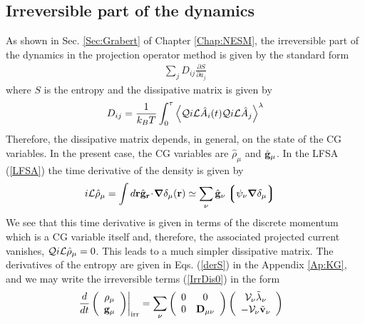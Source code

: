 \documentclass[b5paper,openright,11pt]{book}
\newcommand{\esc}{\!\cdot\!}
\newcommand{\llangle}{\left\langle}
\newcommand{\rrangle}{\right\rangle}
\newcommand{\llg}{\left\lgroup}
\newcommand{\rlg}{\right\rgroup}
\begin{document}
\subsection{Irreversible part of the dynamics}
As shown in  Sec. \ref{Sec:Grabert} of Chapter  \ref{Chap:NESM}, the  irreversible part of the
dynamics in  the projection operator  method is given by  the standard
form
\begin{align}
  \sum_jD_{ij}\frac{\partial S}{\partial a_j}
\label{IrrDis0}
\end{align}
where $S$ is the entropy and the dissipative matrix is given by
\begin{align}
  D_{ij}=\frac{1}{k_BT}\int_0^\tau\llangle {\cal Q}i{\cal L}\hat{A}_i(t){\cal Q}i{\cal L}\hat{A}_j\rrangle^{\lambda}
\end{align}
Therefore,  the dissipative  matrix  depends,  in
general, on the state of the CG variables.  In the present case, the CG
variables are $\hat{\rho}_\mu$ and $\hat{\bf g}_\mu$.   In the
LFSA (\ref{LFSA}) the time derivative of the density is given by
\begin{align}
  i{\cal L}\hat{\rho}_\mu &=\int d{\bf r}\hat{\bf g}_{\bf r} \esc\boldsymbol{\nabla}\delta_\mu({\bf r})
\simeq \sum_\nu\hat{\bf g}_\nu \llg\psi_\nu\boldsymbol{\nabla}\delta_\mu\rlg
\end{align}
We see  that this time  derivative is given  in terms of  the discrete
momentum which is a CG  variable itself and, therefore, the associated
projected  current vanishes,  ${\cal Q}i{\cal  L}\hat{\rho}_\mu =0$.
This leads to a much simpler dissipative matrix.
The derivatives of the entropy are  given in Eqs.  (\ref{derS}) in the
Appendix \ref{Ap:KG}, and we  may write the irreversible  terms (\ref{IrrDis0}) in
the form
\begin{align}
\left.\frac{d}{dt}\left(\begin{array}{c}
\rho_\mu\\
{\bf g}_\mu
\end{array}\right)\right|_{\rm irr}
&=\sum_\nu\left(\begin{array}{cc}
0&0\\
0&{\bf D}_{\mu\nu}
\end{array}\right)\left(
\begin{array}{c}
{\cal V}_\nu \tilde{\lambda}_\nu\\
-{\cal V}_\nu \tilde{\bf v}_\nu
\end{array}\right)
\label{IrrDis}
\end{align}
\end{document}
